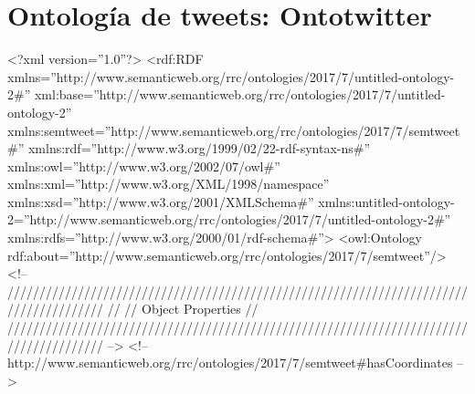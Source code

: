 \chapter{Ontología de tweets: Ontotwitter}

\begin{listing}[
  language = XML,
  numbers=left,
  numberstyle=\tiny,
  stepnumber=5,
  numbersep=5pt,
  frame=single,
  caption  = {Ontología de tweets: Ontotwitter},
  label    = code:ontotwitter]
<?xml version=''1.0''?>
<rdf:RDF
xmlns=''http://www.semanticweb.org/rrc/ontologies/2017/7/untitled-ontology-2#''
     xml:base=''http://www.semanticweb.org/rrc/ontologies/2017/7/untitled-ontology-2''
     xmlns:semtweet=''http://www.semanticweb.org/rrc/ontologies/2017/7/semtweet#''
     xmlns:rdf=''http://www.w3.org/1999/02/22-rdf-syntax-ns#''
     xmlns:owl=''http://www.w3.org/2002/07/owl#''
     xmlns:xml=''http://www.w3.org/XML/1998/namespace''
     xmlns:xsd=''http://www.w3.org/2001/XMLSchema#''
     xmlns:untitled-ontology-2=''http://www.semanticweb.org/rrc/ontologies/2017/7/untitled-ontology-2#''
     xmlns:rdfs=''http://www.w3.org/2000/01/rdf-schema#''>
    <owl:Ontology
    rdf:about=''http://www.semanticweb.org/rrc/ontologies/2017/7/semtweet''/>
    <!-- 
    ///////////////////////////////////////////////////////////////////////////////////////
    //
    // Object Properties
    //
    ///////////////////////////////////////////////////////////////////////////////////////
     -->
    <!--
    http://www.semanticweb.org/rrc/ontologies/2017/7/semtweet#hasCoordinates -->


\end{listing}
